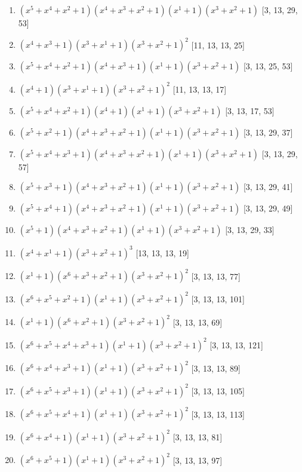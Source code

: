 \documentclass[10pt,twocolumn]{article}
\begin{document}
\begin{enumerate}
\item $(x^{5} + x^{4} + x^{2} + 1)(x^{4} + x^{3} + x^{2} + 1)(x^{1} + 1)(x^{3} + x^{2} + 1)$  [3, 13, 29, 53]
\item $(x^{4} + x^{3} + 1)(x^{3} + x^{1} + 1)(x^{3} + x^{2} + 1)^{2}$  [11, 13, 13, 25]
\item $(x^{5} + x^{4} + x^{2} + 1)(x^{4} + x^{3} + 1)(x^{1} + 1)(x^{3} + x^{2} + 1)$  [3, 13, 25, 53]
\item $(x^{4} + 1)(x^{3} + x^{1} + 1)(x^{3} + x^{2} + 1)^{2}$  [11, 13, 13, 17]
\item $(x^{5} + x^{4} + x^{2} + 1)(x^{4} + 1)(x^{1} + 1)(x^{3} + x^{2} + 1)$  [3, 13, 17, 53]
\item $(x^{5} + x^{2} + 1)(x^{4} + x^{3} + x^{2} + 1)(x^{1} + 1)(x^{3} + x^{2} + 1)$  [3, 13, 29, 37]
\item $(x^{5} + x^{4} + x^{3} + 1)(x^{4} + x^{3} + x^{2} + 1)(x^{1} + 1)(x^{3} + x^{2} + 1)$  [3, 13, 29, 57]
\item $(x^{5} + x^{3} + 1)(x^{4} + x^{3} + x^{2} + 1)(x^{1} + 1)(x^{3} + x^{2} + 1)$  [3, 13, 29, 41]
\item $(x^{5} + x^{4} + 1)(x^{4} + x^{3} + x^{2} + 1)(x^{1} + 1)(x^{3} + x^{2} + 1)$  [3, 13, 29, 49]
\item $(x^{5} + 1)(x^{4} + x^{3} + x^{2} + 1)(x^{1} + 1)(x^{3} + x^{2} + 1)$  [3, 13, 29, 33]
\item $(x^{4} + x^{1} + 1)(x^{3} + x^{2} + 1)^{3}$  [13, 13, 13, 19]
\item $(x^{1} + 1)(x^{6} + x^{3} + x^{2} + 1)(x^{3} + x^{2} + 1)^{2}$  [3, 13, 13, 77]
\item $(x^{6} + x^{5} + x^{2} + 1)(x^{1} + 1)(x^{3} + x^{2} + 1)^{2}$  [3, 13, 13, 101]
\item $(x^{1} + 1)(x^{6} + x^{2} + 1)(x^{3} + x^{2} + 1)^{2}$  [3, 13, 13, 69]
\item $(x^{6} + x^{5} + x^{4} + x^{3} + 1)(x^{1} + 1)(x^{3} + x^{2} + 1)^{2}$  [3, 13, 13, 121]
\item $(x^{6} + x^{4} + x^{3} + 1)(x^{1} + 1)(x^{3} + x^{2} + 1)^{2}$  [3, 13, 13, 89]
\item $(x^{6} + x^{5} + x^{3} + 1)(x^{1} + 1)(x^{3} + x^{2} + 1)^{2}$  [3, 13, 13, 105]
\item $(x^{6} + x^{5} + x^{4} + 1)(x^{1} + 1)(x^{3} + x^{2} + 1)^{2}$  [3, 13, 13, 113]
\item $(x^{6} + x^{4} + 1)(x^{1} + 1)(x^{3} + x^{2} + 1)^{2}$  [3, 13, 13, 81]
\item $(x^{6} + x^{5} + 1)(x^{1} + 1)(x^{3} + x^{2} + 1)^{2}$  [3, 13, 13, 97]

\end{enumerate}
\end{document}
